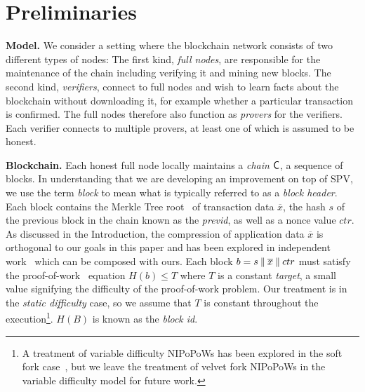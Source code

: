 \section{Preliminaries}\label{sec:preliminaries}

\noindent
\textbf{Model.}
We consider a setting where the blockchain network consists of two different
types of nodes: The first kind, \emph{full nodes}, are responsible for the
maintenance of the chain including verifying it and mining new blocks. The
second kind, \emph{verifiers}, connect to full nodes and wish to learn facts
about the blockchain without downloading it, for example whether a particular
transaction is confirmed. The full nodes therefore also function as
\emph{provers} for the verifiers. Each verifier connects to multiple provers, at
least one of which is assumed to be honest.

\noindent
\textbf{Blockchain.} Each honest full node locally maintains a \emph{chain} $\mathsf{C}$, a sequence of
blocks. In understanding that we are developing an improvement on top of SPV, we
use the term \emph{block} to mean what is typically referred to as a
\emph{block header}. Each block contains the Merkle Tree root~\cite{merkle} of
transaction data $\overline{x}$, the hash $s$ of the previous block in the chain
known as the \emph{previd}, as well as a nonce value $ctr$. As discussed in the
Introduction, the compression of application data $\overline{x}$ is orthogonal
to our goals in this paper and has been explored in independent
work~\cite{edrax} which can be composed with ours. Each block $b = s \mathbin{\|}
\overline{x} \mathbin{\|} ctr$ must satisfy the proof-of-work~\cite{pow} equation $H(b) \leq T$
where $T$ is a constant \emph{target}, a small value signifying the difficulty
of the proof-of-work problem. Our treatment is in the \emph{static difficulty}
case, so we assume that $T$ is constant throughout the execution\footnote{A
treatment of variable difficulty NIPoPoWs has been explored in the soft fork
case~\cite{dionyziz}, but we leave the treatment of velvet fork NIPoPoWs in the
variable difficulty model for future work.}. $H(B)$ is
known as the \emph{block id}.

